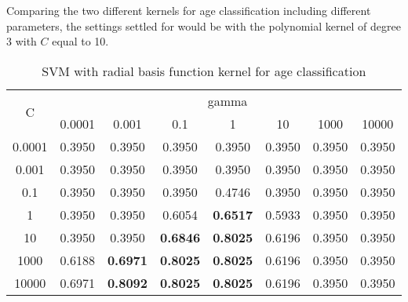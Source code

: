 \documentclass[a4paper]{llncs}
\begin{document}
Comparing the two different kernels for age classification including different parameters, the settings settled for would be with the polynomial kernel of degree 3 with $C$ equal to 10.


\begin{table}[!htbp]
\centering
\begin{tabular}{|c|ccccccc|}
\hline
\multirow{2}{*}{C} & \multicolumn{7}{c|}{gamma}                                                                                                                                                                          \\ %
                   & 0.0001                      & 0.001                       & 0.1                         & \multicolumn{1}{c}{1} & \multicolumn{1}{c}{10} & \multicolumn{1}{c}{1000} & \multicolumn{1}{c|}{10000} \\ \hline
0.0001             & 0.3950                      & 0.3950                      & 0.3950                      & 0.3950                 & 0.3950                  & 0.3950                    & 0.3950                     \\ %
0.001              & \multicolumn{1}{c}{0.3950} & \multicolumn{1}{c}{0.3950} & \multicolumn{1}{c}{0.3950} & 0.3950                 & 0.3950                  & 0.3950                    & 0.3950                     \\ %
0.1                & \multicolumn{1}{c}{0.3950} & \multicolumn{1}{c}{0.3950} & \multicolumn{1}{c}{0.3950} & 0.4746                 & 0.3950                  & 0.3950                    & 0.3950                     \\ %
1                  & 0.3950                      & 0.3950                      & 0.6054                      & \textbf{0.6517}        & 0.5933                  & 0.3950                    & 0.3950                     \\ %
10                 & 0.3950                      & 0.3950                      & \textbf{0.6846}             & \textbf{0.8025}        & 0.6196                  & 0.3950                    & 0.3950                     \\ %
1000               & 0.6188                      & \textbf{0.6971}             & \textbf{0.8025}             & \textbf{0.8025}        & 0.6196                  & 0.3950                    & 0.3950                     \\ %
10000              & 0.6971                      & \textbf{0.8092}             & \textbf{0.8025}             & \textbf{0.8025}        & 0.6196                  & 0.3950                    & 0.3950                     \\ \hline
\end{tabular}
\caption{SVM with radial basis function kernel for age classification}
\label{table:SVMRBFAge}
\end{table}
\end{document}
